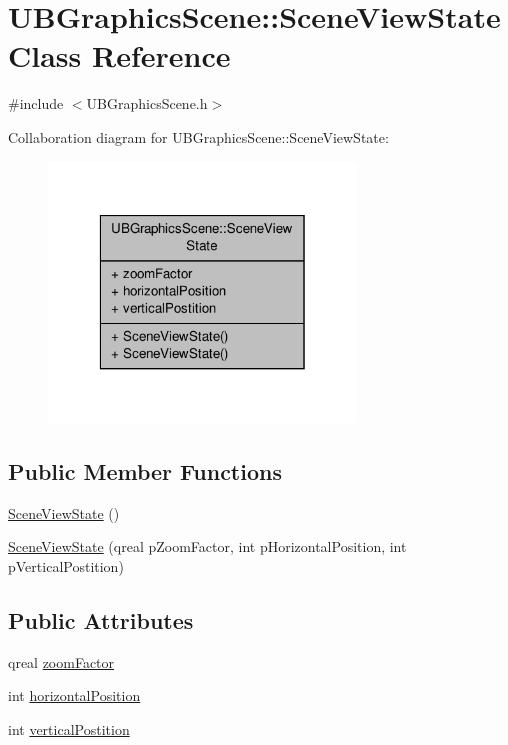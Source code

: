 \hypertarget{class_u_b_graphics_scene_1_1_scene_view_state}{\section{U\-B\-Graphics\-Scene\-:\-:Scene\-View\-State Class Reference}
\label{d5/dec/class_u_b_graphics_scene_1_1_scene_view_state}
}


{\ttfamily \#include $<$U\-B\-Graphics\-Scene.\-h$>$}



Collaboration diagram for U\-B\-Graphics\-Scene\-:\-:Scene\-View\-State\-:
\nopagebreak
\begin{figure}[H]
\begin{center}
\leavevmode
\includegraphics[width=232pt]{de/da5/class_u_b_graphics_scene_1_1_scene_view_state__coll__graph}
\end{center}
\end{figure}
\subsection*{Public Member Functions}
\begin{DoxyCompactItemize}
\item 
\hyperlink{class_u_b_graphics_scene_1_1_scene_view_state_aded351de8f36546e4a877adb74e503ef}{Scene\-View\-State} ()
\item 
\hyperlink{class_u_b_graphics_scene_1_1_scene_view_state_a40399357ab1de37b09580762bb5329e8}{Scene\-View\-State} (qreal p\-Zoom\-Factor, int p\-Horizontal\-Position, int p\-Vertical\-Postition)
\end{DoxyCompactItemize}
\subsection*{Public Attributes}
\begin{DoxyCompactItemize}
\item 
qreal \hyperlink{class_u_b_graphics_scene_1_1_scene_view_state_ac2cbae08e32cec5646f9671a47412876}{zoom\-Factor}
\item 
int \hyperlink{class_u_b_graphics_scene_1_1_scene_view_state_a24761f63e17a8a911e55367bc44bcafe}{horizontal\-Position}
\item 
int \hyperlink{class_u_b_graphics_scene_1_1_scene_view_state_aef54a9ce8fd50a7dbec5a60435d2a84e}{vertical\-Postition}
\end{DoxyCompactItemize}


